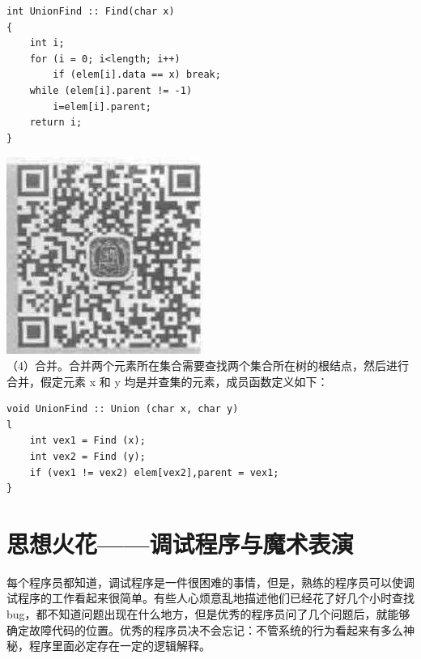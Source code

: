 \documentclass[10pt]{article}
\begin{document}
\begin{verbatim}
int UnionFind :: Find(char x)
{
    int i;
    for (i = 0; i<length; i++)
        if (elem[i].data == x) break;
    while (elem[i].parent != -1)
        i=elem[i].parent;
    return i;
}
\end{verbatim}

\includegraphics[max width=\textwidth, center]{2025_06_06_704745ea57b15b2333e5g-179}\\
（4）合并。合并两个元素所在集合需要查找两个集合所在树的根结点，然后进行合并，假定元素 x 和 y 均是并查集的元素，成员函数定义如下：

\begin{verbatim}
void UnionFind :: Union (char x, char y)
l
    int vex1 = Find (x);
    int vex2 = Find (y);
    if (vex1 != vex2) elem[vex2],parent = vex1;
}
\end{verbatim}

\section*{思想火花——调试程序与魔术表演}
每个程序员都知道，调试程序是一件很困难的事情，但是，熟练的程序员可以使调试程序的工作看起来很简单。有些人心烦意乱地描述他们已经花了好几个小时查找 bug，都不知道问题出现在什么地方，但是优秀的程序员问了几个问题后，就能够确定故障代码的位置。优秀的程序员决不会忘记：不管系统的行为看起来有多么神秘，程序里面必定存在一定的逻辑解释。
\end{document}
